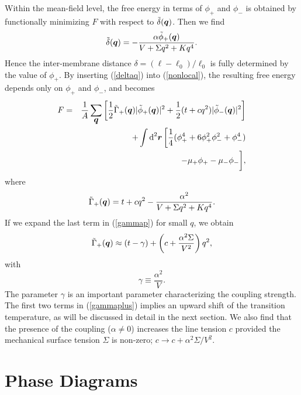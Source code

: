 Within the mean-field level, the free energy in terms of $\phi_+$
and $\phi_-$ is obtained by functionally minimizing $F$ with
respect to $\tilde{\delta}(\mbox{\boldmath $q$})$. Then we find
%
\begin{equation}
\tilde{\delta}(\mbox{\boldmath $q$}) = -\frac{\alpha
\tilde{\phi}_+(\mbox{\boldmath $q$})} {V + \Sigma q^2 + K q^4}.
\label{deltaq}
\end{equation}
%
Hence the inter-membrane distance $\delta=(\ell-\ell_0)/\ell_0$ is
fully determined by the value of $\phi_+$.
By inserting (\ref{deltaq}) into (\ref{nonlocal}), the resulting
free energy depends only on $\phi_+$ and $\phi_-$, and becomes
%
\begin{eqnarray}
F & = & \frac{1}{A}\sum_{\mbox{\boldmath $q$}} \, \biggr[
\frac{1}{2} \tilde{\Gamma}_+(\mbox{\boldmath $q$}) \vert
\tilde{\phi}_+(\mbox{\boldmath $q$}) \vert^2 + \frac{1}{2} (t + c
q^2) \vert \tilde{\phi}_-(\mbox{\boldmath $q$}) \vert^2 \biggr]
\nonumber  \\ & & + \int \mbox{d}^2 \mbox{\boldmath $r$} \,
\biggr[ \frac{1}{4} (\phi_+^4 + 6 \phi_+^2 \phi_-^2 + \phi_-^4)
\nonumber  \\ & & -\mu_+ \phi_+ -\mu_- \phi_- \biggr],
\end{eqnarray}
%
where
%
\begin{equation}
\tilde{\Gamma}_+(\mbox{\boldmath $q$}) = t + cq^2 -
\frac{\alpha^2}{{V + \Sigma q^2 + K q^4}}. \label{gammap}
\end{equation}
If we expand the last term in (\ref{gammap}) for small $q$,
we obtain
%
\begin{equation}
\tilde{\Gamma}_+(\mbox{\boldmath $q$}) \approx (t - \gamma) +
\left( c + \frac{\alpha^2 \Sigma}{V^2} \right) q^2,
\label{gammaplus}
\end{equation}
%
with
\begin{equation}
\gamma\equiv \frac{\alpha^2}{V}.
\label{gamma}
\end{equation}
The parameter $\gamma$ is an important parameter
characterizing the coupling strength.
The first two terms in (\ref{gammaplus}) implies an upward shift of
the transition temperature, as will be discussed in detail in the
next section.
We also find that the presence of the coupling ($\alpha\ne 0$) increases
the line tension $c$ provided the mechanical surface tension
$\Sigma$ is non-zero; $c \rightarrow c + {\alpha^2\Sigma}/{V^2}$.




\section{Phase Diagrams}
\label{sec:phase}


